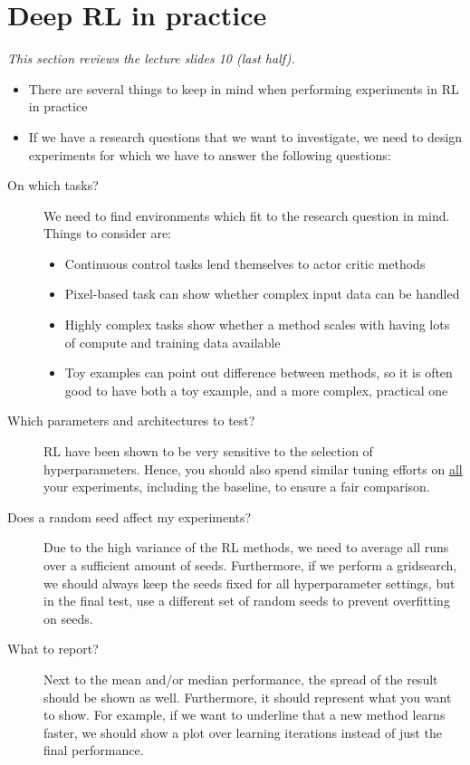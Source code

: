 \section{Deep RL in practice}
\textit{This section reviews the lecture slides 10 (last half).}
\begin{itemize}
	\item There are several things to keep in mind when performing experiments in RL in practice
	\item If we have a research questions that we want to investigate, we need to design experiments for which we have to answer the following questions:
\end{itemize}
\begin{description}
	\item[On which tasks?] We need to find environments which fit to the research question in mind. Things to consider are:
	\begin{itemize}
		\item Continuous control tasks lend themselves to actor critic methods
		\item Pixel-based task can show whether complex input data can be handled
		\item Highly complex tasks show whether a method scales with having lots of compute and training data available
		\item Toy examples can point out difference between methods, so it is often good to have both a toy example, and a more complex, practical one
	\end{itemize}
	\item[Which parameters and architectures to test?] RL have been shown to be very sensitive to the selection of hyperparameters. Hence, you should also spend similar tuning efforts on \underline{all} your experiments, including the baseline, to ensure a fair comparison.
	\item[Does a random seed affect my experiments?] Due to the high variance of the RL methods, we need to average all runs over a sufficient amount of seeds. Furthermore, if we perform a gridsearch, we should always keep the seeds fixed for all hyperparameter settings, but in the final test, use a different set of random seeds to prevent overfitting on seeds.
	\item[What to report?] Next to the mean and/or median performance, the spread of the result should be shown as well. Furthermore, it should represent what you want to show. For example, if we want to underline that a new method learns faster, we should show a plot over learning iterations instead of just the final performance.
\end{description}

